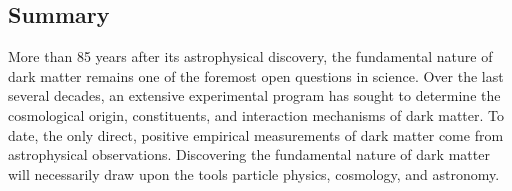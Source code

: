 \documentclass[12pt]{article}
\begin{document}
\pagebreak


\vspace{-1em} \subsection*{Summary}

More than 85 years after its astrophysical discovery, the fundamental nature of dark matter remains one of the foremost open questions in science.
Over the last several decades, an extensive experimental program has sought to determine the cosmological origin, constituents, and interaction mechanisms of dark matter. 
To date, the only direct, positive empirical measurements of dark matter come from astrophysical observations.
Discovering the fundamental nature of dark matter will necessarily draw upon the tools particle physics, cosmology, and astronomy.
\end{document}
